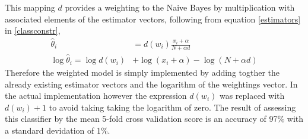 \documentclass[12pt, a4paper]{article}
\begin{document}
\begin{minipage}{\linewidth}
	This mapping $d$ provides a weighting to the Naive Bayes by multiplication with associated elements of the estimator vectors, following from equation \ref{estimators} in \ref{classconstr},
  \begin{align*}
		\hat{\theta}_i &= d(w_i)\frac{x_i + \alpha}{N + \alpha d} \\
		\log \hat{\theta}_i = \log d(w_i) &+ \log(x_i + \alpha) - \log(N + \alpha d)
	\end{align*}
	Therefore the weighted model is simply implemented by adding togther the already existing estimator vectors and the logarithm of the weightings vector. In the actual implementation however the expression $d(w_i)$ was replaced with $d(w_i) + 1$ to avoid taking taking the logarithm of zero. The result of assessing this classifier by the mean 5-fold cross validation score is an accuracy of 97\% with a standard devidation of 1\%.

	\end{minipage}
\end{document}
